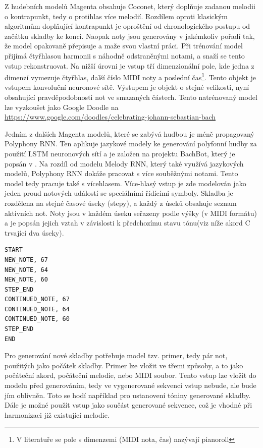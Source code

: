 Z hudebních modelů Magenta obsahuje Coconet, 
který doplňuje zadanou melodii o kontrapunkt, 
tedy o protihlas více melodií\cite{kofron, huang2017counterpoint}.
Rozdílem oproti klasickým algoritmům doplňující kontrapunkt
je oproštění od chronologického postupu od začátku skladby ke konci.
Naopak noty jsou generovány v jakémkoliv pořadí tak, 
že model opakovaně přepisuje a maže svou vlastní práci.
Při trénování model přijímá čtyřhlasou harmonii s náhodně odstraněnými notami,
a snaží se tento vstup rekonstruovat.
Na nižší úrovni je vstup tří dimenzionální pole, 
kde jedna z dimenzí vymezuje čtyřhlas, další číslo MIDI noty a poslední čas\footnote{V literatuře se pole s dimenzemi (MIDI nota, čas) nazývají pianoroll}.
Tento objekt je vstupem konvoluční neuronové sítě.  
Výstupem je objekt o stejné velikosti, 
nyní obsahující pravděpodobnosti not ve smazaných částech.
\cite{huang2017counterpoint}
Tento natrénovaný model lze vyzkoušet jako Google Doodle na \url{https://www.google.com/doodles/celebrating-johann-sebastian-bach}
\par
Jedním z dalších Magenta modelů, které se zabývá hudbou je méně propagovaný Polyphony RNN. 
Ten aplikuje jazykové modely ke generování polyfonní hudby za použití LSTM neuronových sítí
a je založen na projektu BachBot, který je popsán v \cite{Liang_AutomaticComposition}.
Na rozdíl od modelu Melody RNN, který také využívá jazykových modelů, 
Polyphony RNN dokáže pracovat s více souběžnými notami.
Tento model tedy pracuje také s vícehlasem.
Více-hlasý vstup je zde modelován jako jeden proud notových událostí se speciálními řídícími symboly.
Skladba je rozdělena na stejné časové úseky (stepy), 
a každý z úseků obsahuje seznam aktivních not.
Noty jsou v každém úseku seřazeny podle výšky (v MIDI formátu) 
a je popsán jejich vztah v závislosti k předchozímu stavu tónu(viz níže akord C trvající dva úseky).
\cite{google_git_polyphony}
\begin{verbatim}
START
NEW_NOTE, 67
NEW_NOTE, 64
NEW_NOTE, 60
STEP_END
CONTINUED_NOTE, 67
CONTINUED_NOTE, 64
CONTINUED_NOTE, 60
STEP_END
END
\end{verbatim}
Pro generování nové skladby potřebuje model tzv. primer, tedy pár not, 
použitých jako počátek skladby. 
Primer lze vložit ve třemi způsoby, a to jako počáteční akord,
počáteční melodie, nebo MIDI soubor.
Tento vstup lze vložit do modelu před generováním,
tedy ve vygenerované sekvenci vstup nebude, ale bude jím oblivněn.
Toto se hodí například pro ustanovení tóniny generované skladby.
Dále je možné použít vstup jako součást generované sekvence,
což je vhodné při harmonizaci již existující melodie.
\cite{google_git_polyphony}

